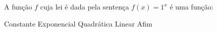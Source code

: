 A função $f$ cuja lei é dada pela sentença $f(x)=1^x$ é uma função:

Constante
Exponencial
Quadrática
Linear
Afim



